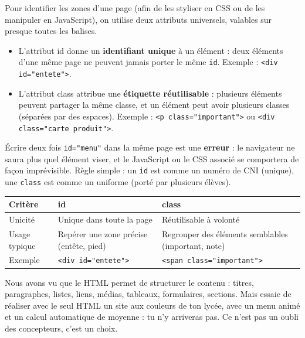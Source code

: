\documentclass[11pt]{article}
\newcommand{\cle}[1]{{\popxbold\color{popdark}#1}}
\newcounter{popsec}
\newcounter{popsub}
\newcommand{\courssub}[1]{%
  \stepcounter{popsub}%
  \par\vspace{9pt}\noindent{\popxbold\fontsize{11.5}{13}\selectfont\color{popink}{\color{poporange}\thepopsec.\thepopsub}\hspace{6pt}#1}\par\nopagebreak\vspace{4pt}
}
\begin{document}
Pour identifier les zones d'une page (afin de les styliser en CSS ou de les manipuler en JavaScript), on utilise deux attributs universels, valables sur presque toutes les balises.

\begin{definition}
\begin{itemize}
  \item L'attribut \cle{id} donne un \textbf{identifiant unique} à un élément : deux éléments d'une même page ne peuvent jamais porter le même \texttt{id}. Exemple : \texttt{<div id="entete">}.
  \item L'attribut \cle{class} attribue une \textbf{étiquette réutilisable} : plusieurs éléments peuvent partager la même classe, et un élément peut avoir plusieurs classes (séparées par des espaces). Exemple : \texttt{<p class="important">} ou \texttt{<div class="carte produit">}.
\end{itemize}
\end{definition}

\begin{attention}
Écrire deux fois \texttt{id="menu"} dans la même page est une \textbf{erreur} : le navigateur ne saura plus quel élément viser, et le JavaScript ou le CSS associé se comportera de façon imprévisible. Règle simple : un \texttt{id} est comme un numéro de CNI (unique), une \texttt{class} est comme un uniforme (porté par plusieurs élèves).
\end{attention}

\begin{center}
\begin{tabularx}{\linewidth}{|l|X|X|}
\hline
\rowcolor{popblueL} \textbf{Critère} & \textbf{id} & \textbf{class} \\
\hline
Unicité & Unique dans toute la page & Réutilisable à volonté \\
\hline
Usage typique & Repérer une zone précise (entête, pied) & Regrouper des éléments semblables (important, note) \\
\hline
Exemple & \texttt{<div id="entete">} & \texttt{<span class="important">} \\
\hline
\end{tabularx}
\end{center}

\courssub{Les limites du HTML}

Nous avons vu que le HTML permet de structurer le contenu : titres, paragraphes, listes, liens, médias, tableaux, formulaires, sections. Mais essaie de réaliser avec le seul HTML un site aux couleurs de ton lycée, avec un menu animé et un calcul automatique de moyenne : tu n'y arriveras pas. Ce n'est pas un oubli des concepteurs, c'est un choix.
\end{document}
